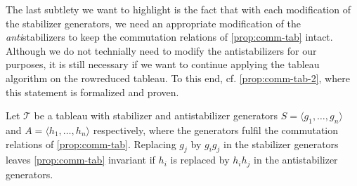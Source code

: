 The last subtlety we want to highlight is the fact that with each modification
of the stabilizer generators, we need an appropriate modification of the
\emph{anti}stabilizers to keep the commutation relations of
\cref{prop:comm-tab} intact. Although we do not technially need to modify the
antistabilizers for our purposes, it is still necessary if we want to continue
applying the tableau algorithm on the rowreduced tableau. To this end, cf.
\cref{prop:comm-tab-2}, where this statement is formalized and proven.
\begin{prop}\label{prop:comm-tab-2}
  Let $\mathcal{T}$ be a tableau with stabilizer and antistabilizer generators
  $S=\langle g_1, \ldots, g_n \rangle$ and $A=\langle h_1, \ldots, h_n \rangle$
  respectively, where the generators fulfil the commutation relations of
  \cref{prop:comm-tab}. 
  Replacing $g_j$ by $g_i g_j$ in the stabilizer generators leaves
  \cref{prop:comm-tab} invariant if $h_i$ is replaced by $h_i h_j$ in the antistabilizer
  generators.
\end{prop}
